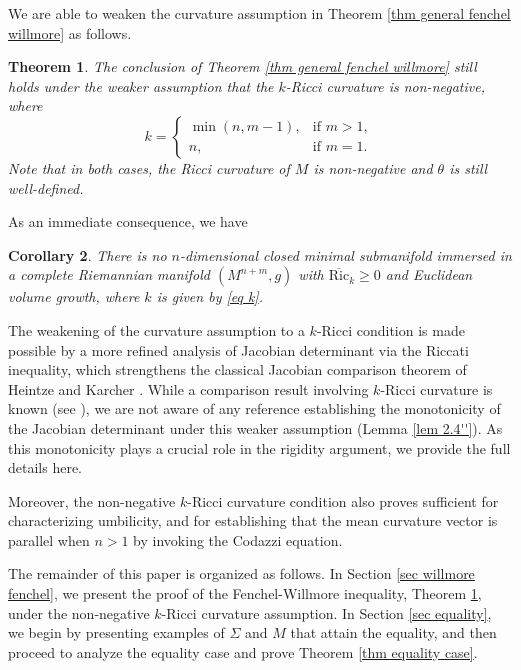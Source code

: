 \documentclass[11pt, reqno]{amsart}
\newtheorem{theorem}{Theorem}[section]
\newtheorem{corollary}[theorem]{Corollary}
\numberwithin{equation}{section}
\begin{document}
We are able to weaken the curvature assumption in Theorem \ref{thm general fenchel willmore} as follows.
\begin{theorem}\label{thm general fenchel willmore'}
The conclusion of Theorem \ref{thm general fenchel willmore} still holds under the weaker assumption that the $k$-Ricci curvature is non-negative, where
\begin{equation}\label{eq k}
k=
\begin{cases}
\min(n, m-1), & \text{if } m > 1, \\
n, & \text{if } m = 1.
\end{cases}
\end{equation}
Note that in both cases, the Ricci curvature of $M$ is non-negative and $\theta$ is still well-defined.
\end{theorem}

As an immediate consequence, we have
\begin{corollary}
There is no $n$-dimensional closed minimal submanifold immersed in a complete Riemannian manifold $(M^{n+m}, g)$ with $\overline{\mathrm{Ric}}_k \ge 0$ and Euclidean volume growth, where $k$ is given by \eqref{eq k}.
\end{corollary}

The weakening of the curvature assumption to a $k$-Ricci condition is made possible by a more refined analysis of Jacobian determinant via the Riccati inequality, which strengthens the classical Jacobian comparison theorem of Heintze and Karcher \cite{HeintzeKarcher1978}. While a comparison result involving $k$-Ricci curvature is known (see \cite{Chahine2019}), we are not aware of any reference establishing the monotonicity of the Jacobian determinant under this weaker assumption (Lemma \ref{lem 2.4''}). As this monotonicity plays a crucial role in the rigidity argument, we provide the full details here.

Moreover, the non-negative $k$-Ricci curvature condition also proves sufficient for characterizing umbilicity, and for establishing that the mean curvature vector is parallel when $n > 1$ by invoking the Codazzi equation.

The remainder of this paper is organized as follows. In Section \ref{sec willmore fenchel}, we present the proof of the Fenchel-Willmore inequality, Theorem \ref{thm general fenchel willmore'}, under the non-negative $k$-Ricci curvature assumption. In Section \ref{sec equality}, we begin by presenting examples of $\Sigma$ and $M$ that attain the equality, and then proceed to analyze the equality case and prove Theorem \ref{thm equality case}.
\end{document}
